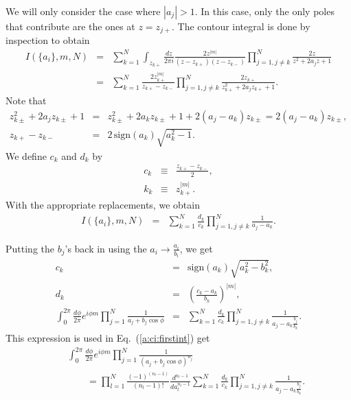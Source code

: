 \documentclass[aps,prc,preprint,tightenlines]{revtex4}
\begin{document}
We will only consider the case where $|a_j|>1$. In this case, only the
only poles that contribute are the ones at $z=z_{j+}$.  The contour
integral is done by inspection to obtain
\begin{eqnarray}
I(\{a_i\},m,N) 
&=&
\sum_{k=1}^N
\int_{z_{k+}} \frac{dz}{2\pi i}
\frac{2 z^{|m|}}{(z-z_{k+})(z-z_{k-})}
\prod_{j=1,j\neq k}^N
\frac{2 z}{z^2 + 2 a_j z + 1} \\
&=&
\sum_{k=1}^N \frac{2 z_{k+}^{|m|}}{z_{k+}-z_{k-}}
\prod_{j=1,j\neq k}^N
\frac{2 z_{k+}}
{z_{k+}^2 + 2 a_j z_{k+} + 1}.
\end{eqnarray}
Note that
\begin{eqnarray}
z_{k\pm}^2 + 2 a_j z_{k\pm} + 1
&=& z_{k\pm}^2 + 2 a_k z_{k\pm} + 1
+ 2 (a_j -a_k) z_{k\pm}
= 2 (a_j -a_k) z_{k\pm}, \\
z_{k+}-z_{k-} &=& 
2\, \mbox{sign}(a_k) \sqrt{a_k^2-1}.
\end{eqnarray}
We define $c_k$ and $d_k$ by
\begin{eqnarray}
c_k &\equiv& \frac{z_{k+}-z_{k-}}{2}, \\
k_k &\equiv& z_{k+}^{|m|}.
\end{eqnarray}
With the appropriate replacements, we obtain
\begin{eqnarray}
I(\{a_i\},m,N) 
&=& \sum_{k=1}^N \frac{d_k}{c_k} \prod_{j=1,j\neq k}^N \frac{1}{a_j-a_k}.
\end{eqnarray}

Putting the $b_j$'s back in using the $a_i\rightarrow\frac{a_i}{b_i}$,
we get
\begin{eqnarray}
c_k &=& \mbox{sign}(a_k) \sqrt{a_k^2-b_k^2}, \\
d_k &=& \left(\frac{c_k-a_k}{b_k}\right)^{|m|}, \\
\int_0^{2\pi} \frac{d\phi}{2\pi} e^{i \phi m} 
\prod_{j=1}^N \frac{1}{a_j + b_j \cos\phi}
&=&
\sum_{k=1}^N \frac{d_k}{c_k}
\prod_{j=1,j\neq k}^N \frac{1}{a_j-a_k \frac{b_j}{b_k}}.
\end{eqnarray}
This expression is used in Eq.~(\ref{a:ci:firstint}) get
\begin{eqnarray}
&&\int_0^{2\pi} \frac{d\phi}{2\pi} e^{i \phi m} 
\prod_{j=1}^N \frac{1}{(a_j + b_j \cos\phi)^{n_j}} \nonumber\\
&& \qquad =
\prod_{l=1}^N \frac{(-1)^{(n_l-1)}}{(n_l-1)!} \frac{d^{n_l-1}}{d a_l^{n_l-1}}
\sum_{k=1}^N \frac{d_k}{c_k}
\prod_{j=1,j\neq k}^N \frac{1}{a_j-a_k \frac{b_j}{b_k}} \label{eqn:firstcosint}.
\end{eqnarray}
\end{document}
